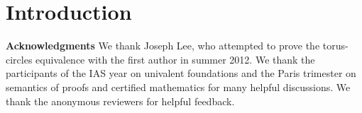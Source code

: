 \documentclass[conference, compsocconf]{drl-common/IEEEtran}
\begin{document}
\section{Introduction}










\medskip

\textbf{Acknowledgments} We thank Joseph Lee, who attempted
to prove the torus-circles equivalence with the first author in summer
2012.  We thank the participants of the IAS year on univalent
foundations and the Paris trimester on semantics of proofs and certified
mathematics for many helpful discussions.  We thank the anonymous
reviewers for helpful feedback.  

\setlength{\bibsep}{-1pt} %
{ \small


}
\end{document}
